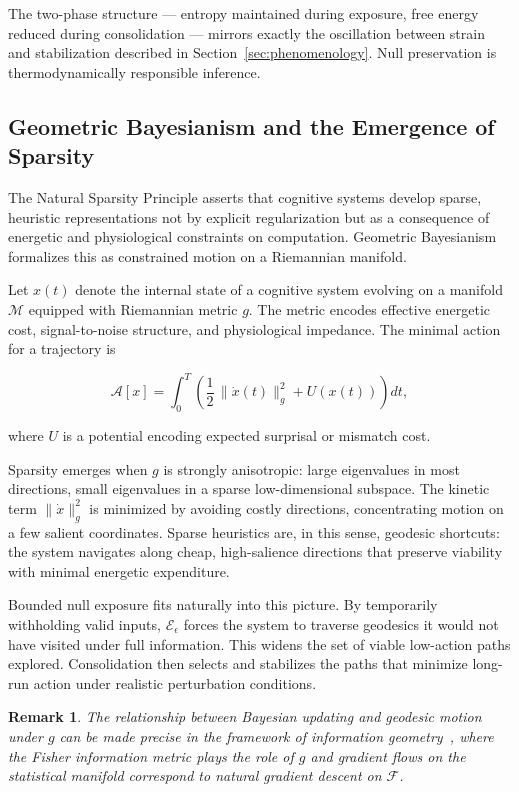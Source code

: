 \documentclass[11pt]{article}
\newtheorem{remark}{Remark}
\theoremstyle{remark}
\begin{document}
The two-phase structure --- entropy maintained during exposure, free energy reduced during consolidation --- mirrors exactly the oscillation between strain and stabilization described in Section~\ref{sec:phenomenology}. Null preservation is thermodynamically responsible inference.

\subsection{Geometric Bayesianism and the Emergence of Sparsity}

The Natural Sparsity Principle asserts that cognitive systems develop sparse, heuristic representations not by explicit regularization but as a consequence of energetic and physiological constraints on computation. Geometric Bayesianism formalizes this as constrained motion on a Riemannian manifold.

Let $x(t)$ denote the internal state of a cognitive system evolving on a manifold $\mathcal{M}$ equipped with Riemannian metric $g$. The metric encodes effective energetic cost, signal-to-noise structure, and physiological impedance. The minimal action for a trajectory is

\begin{equation}
\mathcal{A}[x] = \int_0^T \left( \frac{1}{2}\,\|\dot{x}(t)\|_g^2 + U(x(t)) \right) dt,
\label{eq:action}
\end{equation}

where $U$ is a potential encoding expected surprisal or mismatch cost.

Sparsity emerges when $g$ is strongly anisotropic: large eigenvalues in most directions, small eigenvalues in a sparse low-dimensional subspace. The kinetic term $\|\dot{x}\|_g^2$ is minimized by avoiding costly directions, concentrating motion on a few salient coordinates. Sparse heuristics are, in this sense, geodesic shortcuts: the system navigates along cheap, high-salience directions that preserve viability with minimal energetic expenditure.

Bounded null exposure fits naturally into this picture. By temporarily withholding valid inputs, $\mathcal{E}_\epsilon$ forces the system to traverse geodesics it would not have visited under full information. This widens the set of viable low-action paths explored. Consolidation then selects and stabilizes the paths that minimize long-run action under realistic perturbation conditions.

\begin{remark}
The relationship between Bayesian updating and geodesic motion under $g$ can be made precise in the framework of information geometry~\cite{amari}, where the Fisher information metric plays the role of $g$ and gradient flows on the statistical manifold correspond to natural gradient descent on $\mathcal{F}$.
\end{remark}
\end{document}
